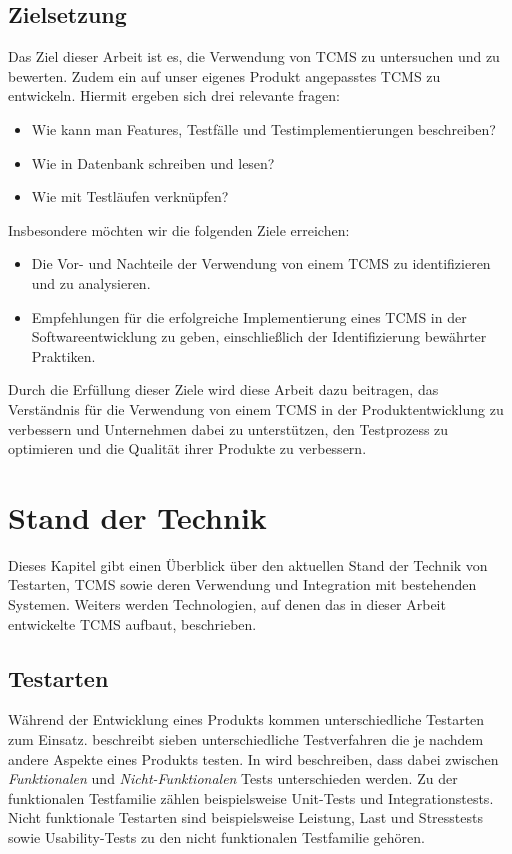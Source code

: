 \documentclass[a4paper, fontsize=11pt, parskip=half, twoside]{scrreprt}
\begin{document}
	\section{Zielsetzung}
	Das Ziel dieser Arbeit ist es, die Verwendung von \ac{TCMS} zu untersuchen und zu bewerten. 
	Zudem ein auf unser eigenes Produkt angepasstes \ac{TCMS} zu entwickeln. 
	Hiermit ergeben sich drei relevante fragen:
	
	\begin{itemize}
		\item Wie kann man Features, Testfälle und Testimplementierungen beschreiben? 
		\item Wie in Datenbank schreiben und lesen? 
		\item Wie mit Testläufen verknüpfen?
	\end{itemize}
	
	Insbesondere möchten wir die folgenden Ziele erreichen:
	
	\begin{itemize}
		\item Die Vor- und Nachteile der Verwendung von einem \ac{TCMS} zu identifizieren und zu analysieren.
		\item Empfehlungen für die erfolgreiche Implementierung eines \ac{TCMS} in der Softwareentwicklung zu geben, einschließlich der Identifizierung bewährter Praktiken.
	\end{itemize}
	
	Durch die Erfüllung dieser Ziele wird diese Arbeit dazu beitragen, das Verständnis für die Verwendung von einem \ac{TCMS} in der Produktentwicklung zu verbessern und Unternehmen dabei zu unterstützen, den Testprozess zu optimieren und die Qualität ihrer Produkte zu verbessern.
	
	
	
	\chapter{Stand der Technik}
	Dieses Kapitel gibt einen Überblick über den aktuellen Stand der Technik von Testarten, \ac{TCMS} sowie deren Verwendung und Integration mit bestehenden Systemen. 
	Weiters werden Technologien, auf denen das in dieser Arbeit entwickelte \ac{TCMS} aufbaut, beschrieben.
	
	\section{Testarten} \label{sec:testtypes}
	Während der Entwicklung eines Produkts kommen unterschiedliche Testarten zum Einsatz. 
	\textcite{atlassian_unterschiedlichen_nodate} beschreibt sieben unterschiedliche Testverfahren die je nachdem andere Aspekte eines Produkts testen.
	In \textcite{noauthor_software_nodate} wird beschreiben, dass dabei zwischen \emph{Funktionalen} und \emph{Nicht-Funktionalen} Tests unterschieden werden.
	Zu der funktionalen Testfamilie zählen beispielsweise Unit-Tests und Integrationstests.
	Nicht funktionale Testarten sind beispielsweise Leistung, Last und Stresstests sowie Usability-Tests zu den nicht funktionalen Testfamilie gehören.
	
\end{document}
